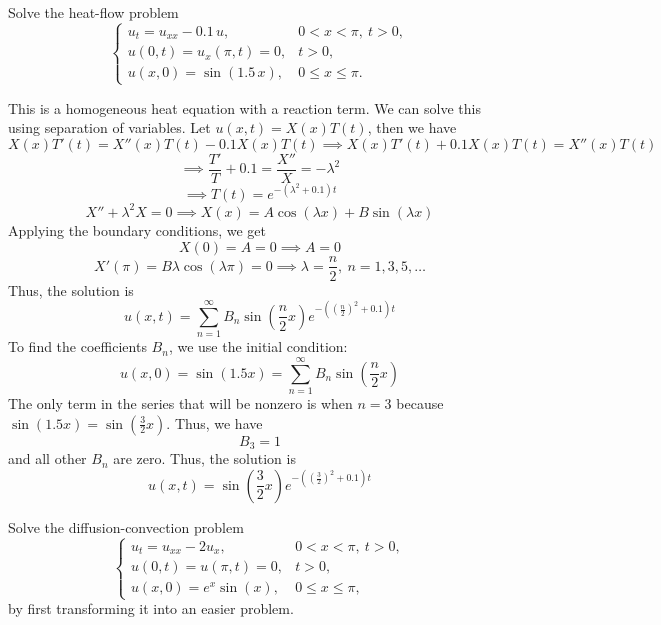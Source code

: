 \documentclass[12pt]{article}
\begin{document}
Solve the heat-flow problem
\[
\begin{cases}
u_t = u_{xx} - 0.1\,u, & 0 < x < \pi,\ t > 0, \\
u(0,t) = u_x(\pi,t) = 0, & t > 0, \\
u(x,0) = \sin(1.5\,x), & 0 \leq x \leq \pi.
\end{cases}
\]

\sol
This is a homogeneous heat equation with a reaction term. We can solve this using separation of variables. Let $u(x,t) = X(x)T(t)$, then we have
\[
X(x) T'(t) = X''(x) T(t) - 0.1 X(x) T(t)
\implies X(x) T'(t) + 0.1 X(x) T(t) = X''(x) T(t)
\]
\[
\implies \frac{T'}{T} + 0.1 = \frac{X''}{X} = -\lambda^2
\]
\[
\implies T(t) = e^{-(\lambda^2 + 0.1) t}
\]
\[
X'' + \lambda^2 X = 0
\implies X(x) = A \cos(\lambda x) + B \sin(\lambda x)
\]
Applying the boundary conditions, we get
\[
X(0) = A = 0 \implies A = 0
\]
\[
X'(\pi) = B \lambda \cos(\lambda \pi) = 0 \implies \lambda = \frac{n}{2}, \ n = 1,3,5,\dots
\]
Thus, the solution is
\[
u(x,t) = \sum_{n=1}^\infty B_n \sin\left(\frac{n}{2} x\right) e^{-\left(\left(\frac{n}{2}\right)^2 + 0.1\right) t}
\]
To find the coefficients $B_n$, we use the initial condition:
\[
u(x,0) = \sin(1.5 x) = \sum_{n=1}^\infty B_n \sin\left(\frac{n}{2} x\right)
\]
The only term in the series that will be nonzero is when $n=3$ because $\sin(1.5 x) = \sin\left(\frac{3}{2} x\right)$. Thus, we have
\[
B_3 = 1
\]
and all other $B_n$ are zero. Thus, the solution is
\[
\boxed{
u(x,t) = \sin\left(\frac{3}{2} x\right) e^{-\left(\left(\frac{3}{2}\right)^2 + 0.1\right) t}
}
\]

Solve the diffusion-convection problem
\[
\begin{cases}
u_t = u_{xx} - 2u_x, & 0 < x < \pi,\ t > 0, \\
u(0,t) = u(\pi,t) = 0, & t > 0, \\
u(x,0) = e^x \sin(x), & 0 \leq x \leq \pi,
\end{cases}
\]
by first transforming it into an easier problem.
\end{document}
